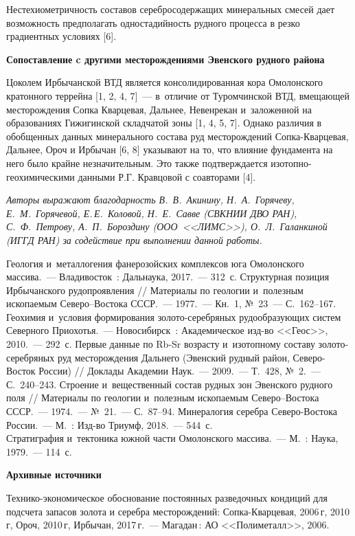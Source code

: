  Нестехиометричность составов серебросодержащих минеральных смесей дает
 возможность предполагать одностадийность рудного процесса в резко
 градиентных условиях [6].

\textbf{Сопоставление c другими месторождениями Эвенского рудного района}

Цоколем Ирбычанской ВТД является консолидированная кора Омолонского кратонного террейна [1, 2, 4, 7]~--- в~отличие от Туромчинской ВТД, вмещающей месторождения Сопка Кварцевая, Дальнее, Невенрекан и~заложенной на образованиях Гижигинской складчатой зоны [1, 4, 5, 7]. Однако различия в обобщенных данных минерального состава руд
месторождений Сопка-Кварцевая, Дальнее, Ороч и Ирбычан [6, 8] указывают на то, что влияние
фундамента на него было крайне незначительным. Это также подтверждается
изотопно-геохимическими данными Р.Г. Кравцовой с соавторами [4].

\textit{Авторы выражают благодарность В.~В.~Акинину,  Н.~А.~Горячеву, Е.~М.~Горячевой, Е.\,Е.~Коловой, Н.~Е.~Савве (СВКНИИ ДВО РАН), С.~Ф.~Петрову, А.~П.~Бороздину (ООО~<<ЛИМС>>), О.~Л.~Галанкиной (ИГГД РАН) за содействие при выполнении данной работы.}


\begin{thebibliography}{99}

\bibitem{}
 Геология и~металлогения фанерозойских комплексов юга Омолонского массива.~--- Владивосток~: Дальнаука, 2017.~--- 312~с.
\bibitem{}
 Структурная позиция Ирбычанского рудопроявления // Материалы по геологии и~полезным ископаемым Северо–Востока СССР.~--- 1977.~---  Кн.~1, №~23~--- С.~162--167.
\bibitem{}
 Геохимия и~условия формирования золото-серебряных рудообразующих систем Северного Приохотья.~--- Новосибирск~: Академическое изд-во <<Геос>>, 2010.~--- 292~с.
\bibitem{}
 Первые данные по Rb-Sr возрасту и~изотопному составу золото-серебряных руд месторождения Дальнего (Эвенский рудный район, Северо-Восток России) // Доклады Академии Наук.~--- 2009.~--- Т.~428, №~2.~--- С.~240--243.
\bibitem{}
 Строение и~вещественный состав рудных зон Эвенского рудного поля // Материалы по геологии и~полезным ископаемым Северо–Востока СССР.~--- 1974.~--- №~21.~--- С.~87--94.
\bibitem{}
 Минералогия серебра Северо-Востока России.~--- М.~: Изд-во Триумф, 2018.~--- 544~с.
\\\bibitem{}
 Стратиграфия и~тектоника южной части Омолонского массива.~--- М.~: Наука, 1979.~--- 114~с.

\textbf{Архивные источники}

\bibitem{}Технико-экономическое обоснование постоянных разведочных кондиций для подсчета запасов золота и серебра месторождений: Сопка-Кварцевая, 2006\,г, 2010\,г, Ороч, 2010\,г, Ирбычан, 2017\,г.~--- Магадан\,: АО <<Полиметалл>>, 2006.

\end{thebibliography}
\thispagestyle{empty}

